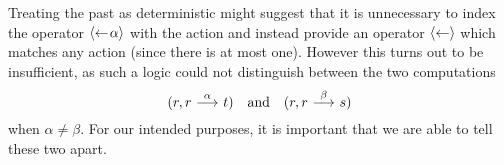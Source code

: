 Treating the past as deterministic might suggest that it is unnecessary to index
the operator $\mbox{\ensuremath{\langle\leftarrow\! \alpha \rangle}}$ with the action and instead provide an operator
$\mbox{\ensuremath{\langle\leftarrow\! \, \rangle}}$ which matches any action (since there is at most one). However this
turns out to be insufficient, as such a logic could not distinguish between the
two computations
\[
    (r, r\ {\stackrel{{\alpha}}{\longrightarrow}}\  t) \quad \textrm{and} \quad (r, r\ {\stackrel{{\beta}}{\longrightarrow}}\  s)
\]
when $\alpha\ne\beta$. For our intended purposes, it is important that we are
able to tell these two apart.
